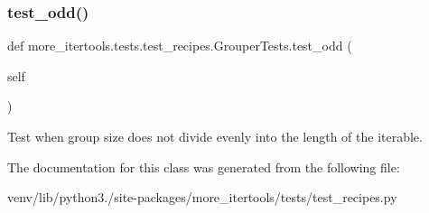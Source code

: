 \subsubsection{\texorpdfstring{test\+\_\+odd()}{test\_odd()}}
{\footnotesize\ttfamily def more\+\_\+itertools.\+tests.\+test\+\_\+recipes.\+Grouper\+Tests.\+test\+\_\+odd (\begin{DoxyParamCaption}\item[{}]{self }\end{DoxyParamCaption})}

\begin{DoxyVerb}Test when group size does not divide evenly into the length of the
iterable.\end{DoxyVerb}
 

The documentation for this class was generated from the following file\+:\begin{DoxyCompactItemize}
\item 
venv/lib/python3./site-\/packages/more\+\_\+itertools/tests/test\+\_\+recipes.\+py\end{DoxyCompactItemize}
